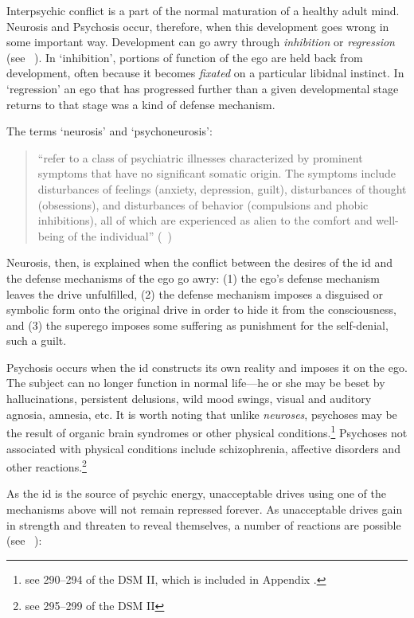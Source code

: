 \begin{refsection}
Interpsychic conflict is a part of the normal maturation of a healthy adult mind. Neurosis and Psychosis occur, therefore, when this development goes wrong in some important way. Development can go awry through \emph{inhibition} or \emph{regression} (see ~\citep[Ch 22--23]{Freud:QdOvAgyZ}). In `inhibition', portions of function of the ego are held back from development, often because it becomes \emph{fixated} on a particular libidnal instinct. In `regression' an ego that has progressed further than a given developmental stage returns to that stage was a kind of defense mechanism.

The terms `neurosis' and `psychoneurosis':

\begin{quote}

“refer to a class of psychiatric illnesses characterized by prominent symptoms that have no significant somatic origin. The symptoms include disturbances of feelings (anxiety, depression, guilt), disturbances of thought (obsessions), and disturbances of behavior (compulsions and phobic inhibitions), all of which are experienced as alien to the comfort and well-being of the individual” (~\citep[p. 737--738]{Arieti:1974tm})
\end{quote}

Neurosis, then, is explained when the conflict between the desires of the id and the defense mechanisms of the ego go awry: (1) the ego's defense mechanism leaves the drive unfulfilled, (2) the defense mechanism imposes a disguised or symbolic form onto the original drive in order to hide it from the consciousness, and (3) the superego imposes some suffering as punishment for the self-denial, such a guilt.

Psychosis occurs when the id constructs its own reality and imposes it on the ego. The subject can no longer function in normal life—he or she may be beset by hallucinations, persistent delusions, wild mood swings, visual and auditory agnosia, amnesia, etc. It is worth noting that unlike \emph{neuroses}, psychoses may be the result of organic brain syndromes or other physical conditions.\footnote{see 290--294 of the DSM II, which is included in Appendix .} Psychoses not associated with physical conditions include schizophrenia, affective disorders and other reactions.\footnote{see 295--299 of the DSM II}

As the id is the source of psychic energy, unacceptable drives using one of the mechanisms above will not remain repressed forever. As unacceptable drives gain in strength and threaten to reveal themselves, a number of reactions are possible (see ~\citep[Ch. 19]{Freud:QdOvAgyZ}):


\end{refsection}
